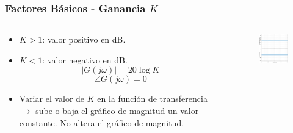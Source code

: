 \documentclass[aspectratio=169]{beamer}
\theoremstyle{definition}
\theoremstyle{plain}
\theoremstyle{remark}
\begin{document}
\begin{frame}[<+->]\frametitle{Factores Básicos - Ganancia $K$}
\begin{columns}
	\begin{column}{0.5\textwidth}
	\begin{itemize}
		\item $K > 1$: valor positivo en dB.
		\item $K < 1$: valor negativo en dB.
		\begin{equation*}
			\left| G(j\omega) \right| = 20 \log K
		\end{equation*}
		\begin{equation*}
			\angle G(j\omega) = 0
		\end{equation*}
		\item Variar el valor de $K$ en la función de transferencia $\rightarrow$ sube o baja el gráfico de magnitud un valor constante. No altera el gráfico de magnitud.
	\end{itemize}
	\end{column}
	\begin{column}{0.5\textwidth}
		\begin{figure}
			\includegraphics[width=6.5cm]{images/bodeGainK.eps}
		\end{figure}
	\end{column}
\end{columns}
\end{frame}
\end{document}
